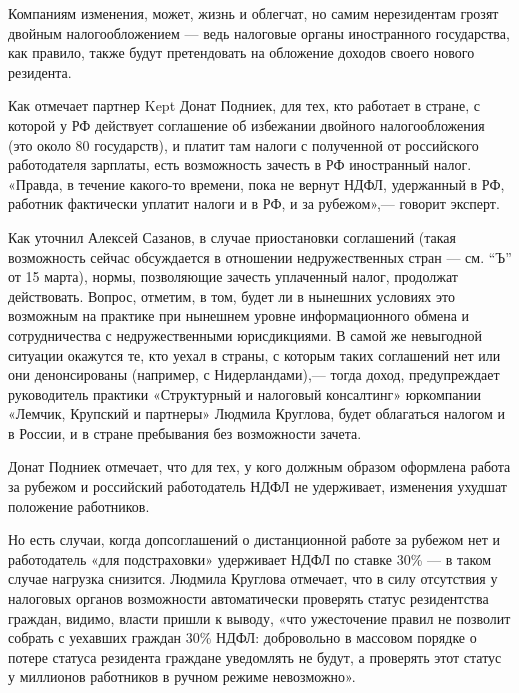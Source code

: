 \begin{fancyquotes}
    Компаниям изменения, может, жизнь и облегчат, но самим нерезидентам грозят двойным налогообложением — ведь налоговые органы иностранного государства, как правило, также будут претендовать на обложение доходов своего нового резидента.
\end{fancyquotes}

Как отмечает партнер Kept Донат Подниек, для тех, кто работает в стране, с которой у РФ действует соглашение об избежании двойного налогообложения (это около 80 государств), и платит там налоги с полученной от российского работодателя зарплаты, есть возможность зачесть в РФ иностранный налог. «Правда, в течение какого-то времени, пока не вернут НДФЛ, удержанный в РФ, работник фактически уплатит налоги и в РФ, и за рубежом»,— говорит эксперт.

Как уточнил Алексей Сазанов, в случае приостановки соглашений (такая возможность сейчас обсуждается в отношении недружественных стран — см. “Ъ” от 15 марта), нормы, позволяющие зачесть уплаченный налог, продолжат действовать. Вопрос, отметим, в том, будет ли в нынешних условиях это возможным на практике при нынешнем уровне информационного обмена и сотрудничества с недружественными юрисдикциями. В самой же невыгодной ситуации окажутся те, кто уехал в страны, с которым таких соглашений нет или они денонсированы (например, с Нидерландами),— тогда доход, предупреждает руководитель практики «Структурный и налоговый консалтинг» юркомпании «Лемчик, Крупский и партнеры» Людмила Круглова, будет облагаться налогом и в России, и в стране пребывания без возможности зачета.

\begin{fancyquotes}
    Донат Подниек отмечает, что для тех, у кого должным образом оформлена работа за рубежом и российский работодатель НДФЛ не удерживает, изменения ухудшат положение работников.
\end{fancyquotes}

Но есть случаи, когда допсоглашений о дистанционной работе за рубежом нет и работодатель «для подстраховки» удерживает НДФЛ по ставке 30\% — в таком случае нагрузка снизится. Людмила Круглова отмечает, что в силу отсутствия у налоговых органов возможности автоматически проверять статус резидентства граждан, видимо, власти пришли к выводу, «что ужесточение правил не позволит собрать с уехавших граждан 30\% НДФЛ: добровольно в массовом порядке о потере статуса резидента граждане уведомлять не будут, а проверять этот статус у миллионов работников в ручном режиме невозможно».

